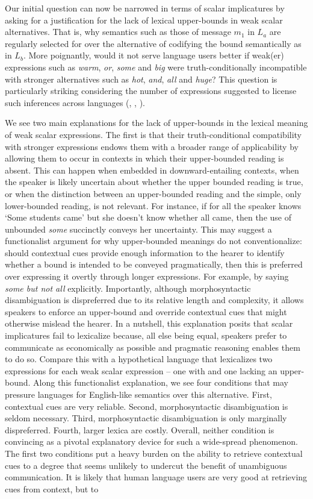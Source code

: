 \documentclass[a4paper]{article}
\begin{document}
Our initial question can now be narrowed in terms of scalar implicatures by asking for a justification for the lack of lexical upper-bounds in weak scalar alternatives. That is, why semantics such as those of message $m_1$ in $L_a$ are regularly selected for over the alternative of codifying the bound semantically as in $L_b$. More poignantly, would it not serve language users better if weak(er) expressions such as {\em warm}, {\em or}, {\em some} and {\em big} were truth-conditionally incompatible with stronger alternatives such as {\em hot}, {\em and}, {\em all} and {\em huge}?  This question is particularly striking considering the number of expressions suggested to license such inferences across languages (\citealt{horn:1972}, \citealt[252-267]{horn:1984}, \citealt{traugott:2004,vdAuwera:2010}). 

We see two main explanations for the lack of upper-bounds in the lexical meaning of weak scalar expressions. The first is that their truth-conditional compatibility with stronger expressions endows them with a broader range of applicability by allowing them to occur in contexts in which their upper-bounded reading is absent. This can happen when embedded in downward-entailing contexts, when the speaker is likely uncertain about whether the upper bounded reading is true, or when the distinction between an upper-bounded reading and the simple, only lower-bounded reading, is not relevant. For instance, if for all the speaker knows `Some students came' but she doesn't know whether all came, then the use of unbounded {\em some} succinctly conveys her uncertainty. This may suggest a functionalist argument for why upper-bounded meanings do not conventionalize: should contextual cues provide enough information to the hearer to identify whether a bound is intended to be conveyed pragmatically, then this is preferred over expressing it overtly through longer expressions. For example, by saying {\em some but not all} explicitly. Importantly, although morphosyntactic disambiguation is dispreferred due to its relative length and complexity, it allows speakers to enforce an upper-bound and override contextual cues that might otherwise mislead the hearer. In a nutshell, this explanation posits that scalar implicatures fail to lexicalize because, all else being equal, speakers prefer to communicate as economically as possible and pragmatic reasoning enables them to do so. Compare this with a hypothetical language that lexicalizes two expressions for each weak scalar expression -- one with and one lacking an upper-bound. Along this functionalist explanation, we see four conditions that may pressure languages for English-like semantics over this alternative. First, contextual cues are very reliable. Second, morphosyntactic disambiguation is seldom necessary. Third, morphosyntactic disambiguation is only marginally dispreferred. Fourth, larger lexica are costly. Overall, neither condition is convincing as a pivotal explanatory device for such a wide-spread phenomenon. The first two conditions put a heavy burden on the ability to retrieve contextual cues to a degree that seems unlikely to undercut the benefit of unambiguous communication. It is likely that human language users are very good at retrieving cues from context, but to 
\end{document}
